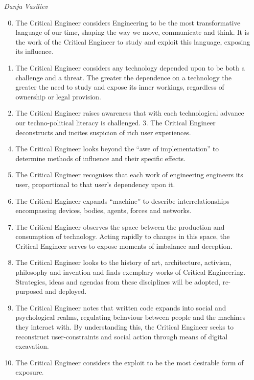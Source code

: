 \documentclass[letterpaper,12pt,english]{sphinxmanual}
\begin{document}
\emph{Danja Vasiliev}
\begin{enumerate}
\setcounter{enumi}{-1}
\item {} 
The Critical Engineer considers Engineering to be the most transformative language of our time, shaping the way we move, communicate and think. It is the work of the Critical Engineer to study and exploit this language, exposing its influence.

\item {} 
The Critical Engineer considers any technology depended upon to be both a challenge and a threat. The greater the dependence on a technology the greater the need to study and expose its inner workings, regardless of ownership or legal provision.

\item {} 
The Critical Engineer raises awareness that with each technological advance our techno-political literacy is challenged. 3. The Critical Engineer deconstructs and incites suspicion of rich user experiences.

\end{enumerate}
\begin{enumerate}
\setcounter{enumi}{3}
\item {} 
The Critical Engineer looks beyond the ``awe of implementation'' to determine methods of influence and their specific effects.

\item {} 
The Critical Engineer recognises that each work of engineering engineers its user, proportional to that user's dependency upon it.

\item {} 
The Critical Engineer expands ``machine'' to describe interrelationships encompassing devices, bodies, agents, forces and networks.

\item {} 
The Critical Engineer observes the space between the production and consumption of technology. Acting rapidly to changes in this space, the Critical Engineer serves to expose moments of imbalance and deception.

\item {} 
The Critical Engineer looks to the history of art, architecture, activism, philosophy and invention and finds exemplary works of Critical Engineering. Strategies, ideas and agendas from these disciplines will be adopted, re-purposed and deployed.

\item {} 
The Critical Engineer notes that written code expands into social and psychological realms, regulating behaviour between people and the machines they interact with. By understanding this, the Critical Engineer seeks to reconstruct user-constraints and social action through means of digital excavation.

\item {} 
The Critical Engineer considers the exploit to be the most desirable form of exposure.

\end{enumerate}
\end{document}

